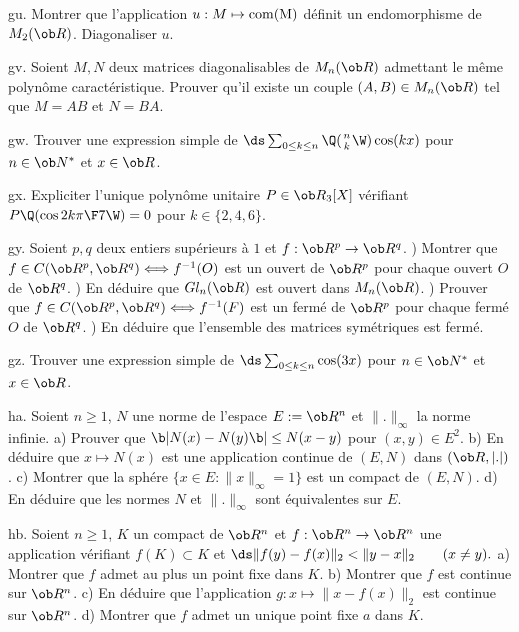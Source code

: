 \exo [Level=2,Fight=1,Learn=1,Type=\Exercices,Field=\Diagonalisation,Origin=] gu. 
Montrer que l'application $u:M\mapsto \rm{com}(M)$ 
définit un endomorphisme de $\sc M_2(\ob R)$. Diagonaliser $u$. 

\exo [Level=2,Fight=1,Learn=1,Type=\Colles,Field=\Diagonalisation,Origin=] gv. 
Soient $M,N$ deux matrices diagonalisables de $\sc M_n(\ob R)$ admettant le même polynôme caractéristique. \pn
Prouver qu'il existe un couple $(A,B)\in\sc M_n(\ob R)$ tel que $M=AB$ et $N=BA$. 

\exo [Level=1,Fight=2,Learn=2,Type=\Exercices,Field=\Trigonométrie,Origin=] gw. 
Trouver une expression simple de 
$\ds\sum_{0\le k\le n}\Q({n\atop k}\W)\cos(kx)$ pour $n\in\ob N^*$ et $x\in\ob R$. 

\exo [Level=1,Fight=2,Learn=1,Type=\Exercices,Field=\Trigonométrie|\Polynômes,Origin=] gx. 
Expliciter l'unique polynôme unitaire 
$P\in\ob R_3[X]$ vérifiant  $P\Q(\cos{2k\pi\F7}\W)=0$ pour $k\in\{2,4,6\}$. 

\exo [Level=2,Fight=2,Learn=2,Type=\Cours,Field=\Continuité,Origin=\MP] gy. %
Soient $p,q$ deux entiers supérieurs à $1$ et $f:\ob R^p\to\ob R^q$. ) Montrer que $f\in\sc C(\ob R^p,\ob R^q)\Longleftrightarrow f^{-1}(O)$ 
est un ouvert de $\ob R^p$ pour chaque ouvert $O$ de $\ob R^q$. ) En déduire que $\sc Gl_n(\ob R)$ est ouvert dans $\sc M_n(\ob R)$. ) Prouver que $f\in\sc C(\ob R^p,\ob R^q)\Longleftrightarrow f^{-1}(F)$ 
est un fermé de $\ob R^p$ pour chaque fermé $O$ de $\ob R^q$. ) En déduire que l'ensemble des matrices symétriques est fermé. 
 
\exo [Level=1,Fight=1,Learn=1,Type=\Exercices,Field=\Trigonométrie,Origin=] gz. 
Trouver une expression simple de $\ds\sum_{0\le k\le n}\cos(3x)$ 
pour $n\in\ob N^*$ et $x\in\ob R$. 

\exo [Level=2,Fight=2,Learn=2,Type=\Cours,Field=\Normes,Origin=\MP] ha. 
Soient $n\ge1$, $N$ une norme de l'espace $E:=\ob R^n$ et $\|.\|_\infty$ la norme infinie. \pn
a) Prouver que $\b|N(x)-N(y)\b|\le N(x-y)$ pour $(x,y)\in E^2$. \pn
b) En déduire que $x\mapsto N(x)$ est une application continue de $(E,N)$ 
dans $(\ob R,|.|)$. \pn
c) Montrer que la sphére $\{x\in E:\|x\|_\infty=1\}$ est un compact de $(E,N)$. \pn
d) En déduire que les normes $N$ et $\|.\|_\infty$ sont équivalentes sur $E$.  
 
\exo [Level=2,Fight=2,Learn=2,Type=\TravauxDirigés,Field=\Compacité,Origin=\MP] hb. 
Soient $n\ge1$, $K$ un compact de $\ob R^n$ et $f:\ob R^n\to\ob R^n$ une application vérifiant $f(K)\subset K$ et  
\medskip
\hfill
$\ds
\|f(y)-f(x)\|_2<\|y-x\|_2\qquad(x\neq y).
$\hfill\null\medskip
\noindent
a) Montrer que $f$ admet au plus un point fixe dans $K$. \pn
b) Montrer que $f$ est continue sur $\ob R^n$. \pn
c) En déduire que l'application $g:x\mapsto\|x-f(x)\|_2$ est continue sur $\ob R^n$. \pn
d) Montrer que $f$ admet un unique point fixe $a$ dans $K$. 

